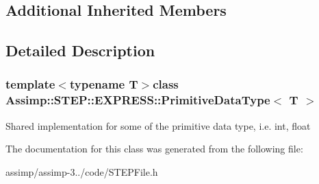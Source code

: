 \subsection*{Additional Inherited Members}


\subsection{Detailed Description}
\subsubsection*{template$<$typename T$>$class Assimp\+::\+S\+T\+E\+P\+::\+E\+X\+P\+R\+E\+S\+S\+::\+Primitive\+Data\+Type$<$ T $>$}

Shared implementation for some of the primitive data type, i.\+e. int, float 

The documentation for this class was generated from the following file\+:\begin{DoxyCompactItemize}
\item 
assimp/assimp-\/3../code/S\+T\+E\+P\+File.\+h\end{DoxyCompactItemize}

